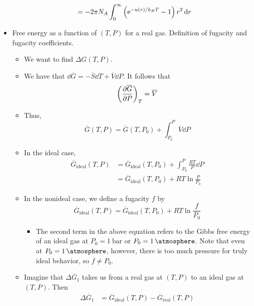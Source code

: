 \documentclass[../notes.tex]{subfiles}
\begin{document}
\begin{itemize}
\begin{itemize}
\begin{align*}
            &= -2\pi N_A\int_0^\infty\left( \e[-u(r)/k_BT]-1 \right)r^2\dd{r}
        \end{align*}
    \end{itemize}
    \item Free energy as a function of $(T,P)$ for a real gas. Definition of fugacity and fugacity coefficients.
    \begin{itemize}
        \item We want to find $\Delta G(T,P)$.
        \item We have that $\dd{\overline{G}}=-\overline{S}\dd{T}+\overline{V}\dd{P}$. It follows that
        \begin{equation*}
            \left( \pdv{\overline{G}}{P} \right)_T = \overline{V}
        \end{equation*}
        \item Thus,
        \begin{equation*}
            \overline{G}(T,P) = \overline{G}(T,P_0)+\int_{P_0}^P\overline{V}\dd{P}
        \end{equation*}
        \item In the ideal case,
        \begin{align*}
            \overline{G}_\text{ideal}(T,P) &= \overline{G}_\text{ideal}(T,P_0)+\int_{P_0}^P\frac{RT}{P}\dd{P}\\
            &= \overline{G}_\text{ideal}(T,P_0)+RT\ln\frac{P}{P_0}
        \end{align*}
        \item In the nonideal case, we define a fugacity $f$ by
        \begin{equation*}
            \overline{G}_\text{ideal}(T,P) = \overline{G}_\text{ideal}(T,P_0)+RT\ln\frac{f}{P_0}
        \end{equation*}
        \begin{itemize}
            \item The second term in the above equation refers to the Gibbs free energy of an ideal gas at $P_0=\SI{1}{\bar}$ or $P_0=\SI{1}{\atmosphere}$. Note that even at $P_0=\SI{1}{\atmosphere}$, however, there is too much pressure for truly ideal behavior, so $f\neq P_0$.
        \end{itemize}
        \item Imagine that $\Delta\overline{G}_1$ takes us from a real gas at $(T,P)$ to an ideal gas at $(T,P)$. Then
        \begin{align*}
            \Delta\overline{G}_1 &= \overline{G}_\text{ideal}(T,P)-\overline{G}_\text{real}(T,P)\\

\end{align*}
\end{itemize}
\end{itemize}
\end{document}
